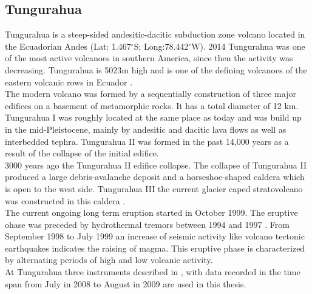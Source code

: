 \documentclass  [
  paper    = a4,
  BCOR     = 10mm,
  twoside,
  fontsize = 12pt,
  fleqn,
  toc      = bibnumbered,
  toc      = listofnumbered,
  numbers  = noendperiod,
  headings = normal,
  listof   = leveldown,
  version  = 3.03
]                                       {scrreprt}
\begin{document}
	\subsection*{Tungurahua \label{Tung}}
	Tungurahua is a steep-sided andesitic-dacitic subduction zone volcano located in the Ecuadorian Andes (Lat: 1.467$^{\circ}$S; Long:78.442$^{\circ}$W). 2014 Tungurahua was one of the most active volcanoes in southern America, since then the activity was decreasing. Tungurahua is 5023m high and is one of the defining volcanoes of the eastern volcanic rows in Ecuador \citep{hall1999tungurahua}.
	\\
	The modern volcano was formed by a sequentially construction of three major edifices on a basement of metamorphic rocks. It has a total diameter of 12 km. Tungurahua I was roughly located at the same place as today and was build up in the mid-Pleistocene, mainly by andesitic and dacitic lava flows as well as interbedded tephra. Tungurahua II was formed in the past 14,000 years as a result of the collapse of the initial edifice.\\
	3000 years ago the Tungurahua II edifice collapse. The collapse of Tungurahua II produced a large debris-avalanche deposit and a horseshoe-shaped caldera which is open to the west side. Tungurahua III the current glacier caped stratovolcano was constructed in this caldera \citep{GlobalVolcanismProgram}.\\
	The current ongoing long term eruption started in October 1999. The eruptive ohase was preceded by hydrothermal tremors between 1994 and 1997 \citep{samaniego}.
	From September 1998 to July 1999 an increase of seismic activity like volcano tectonic earthquakes indicates the raising of magma. This eruptive phase is characterized by alternating periods of high and low volcanic activity. \\
	At Tungurahua three instruments described  in , with data recorded in the time span from July in 2008 to August in 2009 are used in this thesis.
\end{document}

